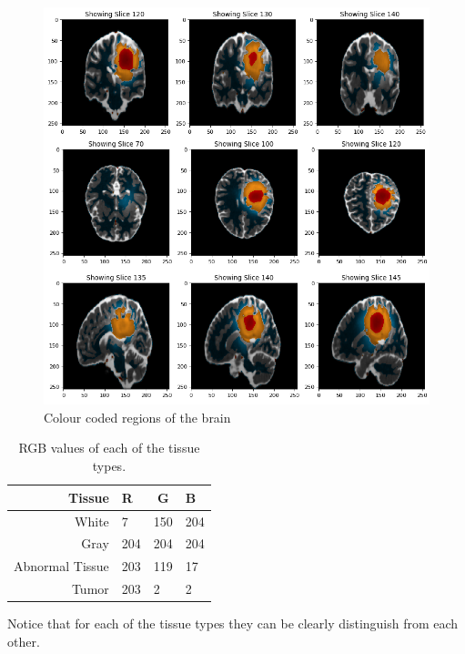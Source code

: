 \begin{figure}[h]
  \centering
  \includegraphics[width=\linewidth]{pictures/colourCodedRegions.png}
  \caption{Colour coded regions of the brain}
  \label{fig:colourCodedRegions}
\end{figure}

\begin{table}[h]
\centering
\begin{tabular}{|r|l|l|l|}
\hline
Tissue & R & \multicolumn{1}{c|}{G} & B \\ \hline
White & 7 & \multicolumn{1}{c|}{150} & 204 \\ \hline
Gray & 204 & 204 & 204 \\ \hline
Abnormal Tissue & 203 & 119 & 17 \\ \hline
Tumor & 203 & 2 & 2 \\ \hline
\end{tabular}
\caption{RGB values of each of the tissue types.}
\label{table:RGBValues}
\end{table}

Notice that for each of the tissue types they can be clearly distinguish from each other. 

